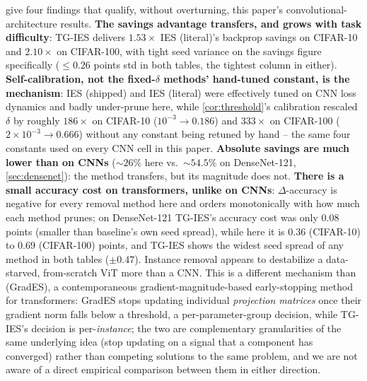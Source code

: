 \documentclass{article}
\theoremstyle{plain}
\theoremstyle{definition}
\theoremstyle{remark}
\begin{document}
 give four findings that qualify, without overturning, this paper's convolutional-architecture results. \textbf{The savings advantage transfers, and grows with task difficulty}: TG-IES delivers $1.53\times$ IES (literal)'s backprop savings on CIFAR-10 and $2.10\times$ on CIFAR-100, with tight seed variance on the savings figure specifically ($\le\!0.26$ points std in both tables, the tightest column in either). \textbf{Self-calibration, not the fixed-$\delta$ methods' hand-tuned constant, is the mechanism}: IES (shipped) and IES (literal) were effectively tuned on CNN loss dynamics and badly under-prune here, while \cref{cor:threshold}'s calibration rescaled $\delta$ by roughly $186\times$ on CIFAR-10 ($10^{-3}\to0.186$) and $333\times$ on CIFAR-100 ($2{\times}10^{-3}\to0.666$) without any constant being retuned by hand -- the same four constants used on every CNN cell in this paper. \textbf{Absolute savings are much lower than on CNNs} ($\sim\!26\%$ here vs.\ $\sim\!54.5\%$ on DenseNet-121, \cref{sec:densenet}): the method transfers, but its magnitude does not. \textbf{There is a small accuracy cost on transformers, unlike on CNNs}: $\Delta$-accuracy is negative for every removal method here and orders monotonically with how much each method prunes; on DenseNet-121 TG-IES's accuracy cost was only $0.08$ points (smaller than baseline's own seed spread), while here it is $0.36$ (CIFAR-10) to $0.69$ (CIFAR-100) points, and TG-IES shows the widest seed spread of any method in both tables ($\pm0.47$). Instance removal appears to destabilize a data-starved, from-scratch ViT more than a CNN. This is a different mechanism than \citet{wen2025grades} (GradES), a contemporaneous gradient-magnitude-based early-stopping method for transformers: GradES stops updating individual \emph{projection matrices} once their gradient norm falls below a threshold, a per-parameter-group decision, while TG-IES's decision is per-\emph{instance}; the two are complementary granularities of the same underlying idea (stop updating on a signal that a component has converged) rather than competing solutions to the same problem, and we are not aware of a direct empirical comparison between them in either direction.
\end{document}
